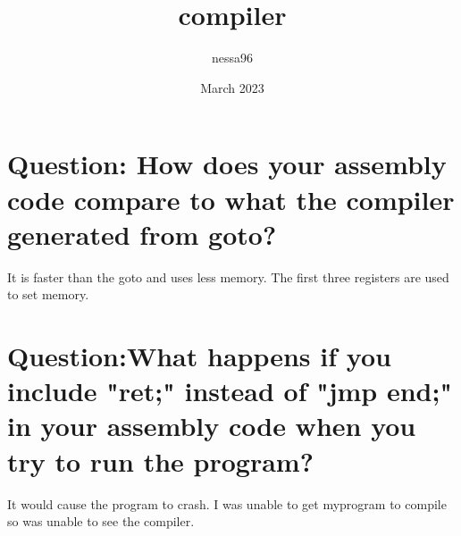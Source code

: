 \documentclass{article}
\title{compiler}
\author{nessa96 }
\date{March 2023}
\begin{document}
\maketitle

\section{Question: How does your assembly code compare to what the compiler generated from goto? }
It is faster than the goto and uses less memory. The first three registers are used to set memory.
\section{Question:What happens if you include "ret;" instead of "jmp end;" in your assembly code when you try to run the program? }
It would cause the program to crash. I was unable to get myprogram to compile so was unable to see the compiler.
\end{document}
